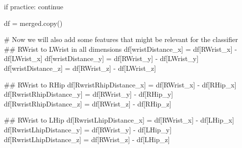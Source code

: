 \documentclass[
  letterpaper,
  DIV=11,
  numbers=noendperiod]{scrreprt}
\newenvironment{Shaded}{\begin{snugshade}}{\end{snugshade}}
\newcommand{\CommentTok}[1]{\textcolor[rgb]{0.37,0.37,0.37}{#1}}
\newcommand{\ControlFlowTok}[1]{\textcolor[rgb]{0.00,0.23,0.31}{#1}}
\newcommand{\NormalTok}[1]{\textcolor[rgb]{0.00,0.23,0.31}{#1}}
\newcommand{\OperatorTok}[1]{\textcolor[rgb]{0.37,0.37,0.37}{#1}}
\newcommand{\StringTok}[1]{\textcolor[rgb]{0.13,0.47,0.30}{#1}}
\begin{document}
\begin{Shaded}
\begin{Highlighting}[]
    \ControlFlowTok{if}\NormalTok{ practice:}
        \ControlFlowTok{continue}

\NormalTok{    df }\OperatorTok{=}\NormalTok{ merged.copy()}

    \CommentTok{\# Now we will also add some features that might be relevant for the classifier}
    \CommentTok{\#\# RWrist to LWrist in all dimensions}
\NormalTok{    df[}\StringTok{\textquotesingle{}wristDistance\_x\textquotesingle{}}\NormalTok{] }\OperatorTok{=}\NormalTok{ df[}\StringTok{\textquotesingle{}RWrist\_x\textquotesingle{}}\NormalTok{] }\OperatorTok{{-}}\NormalTok{ df[}\StringTok{\textquotesingle{}LWrist\_x\textquotesingle{}}\NormalTok{]}
\NormalTok{    df[}\StringTok{\textquotesingle{}wristDistance\_y\textquotesingle{}}\NormalTok{] }\OperatorTok{=}\NormalTok{ df[}\StringTok{\textquotesingle{}RWrist\_y\textquotesingle{}}\NormalTok{] }\OperatorTok{{-}}\NormalTok{ df[}\StringTok{\textquotesingle{}LWrist\_y\textquotesingle{}}\NormalTok{]}
\NormalTok{    df[}\StringTok{\textquotesingle{}wristDistance\_z\textquotesingle{}}\NormalTok{] }\OperatorTok{=}\NormalTok{ df[}\StringTok{\textquotesingle{}RWrist\_z\textquotesingle{}}\NormalTok{] }\OperatorTok{{-}}\NormalTok{ df[}\StringTok{\textquotesingle{}LWrist\_z\textquotesingle{}}\NormalTok{]}

    \CommentTok{\#\# RWrist to RHip}
\NormalTok{    df[}\StringTok{\textquotesingle{}RwristRhipDistance\_x\textquotesingle{}}\NormalTok{] }\OperatorTok{=}\NormalTok{ df[}\StringTok{\textquotesingle{}RWrist\_x\textquotesingle{}}\NormalTok{] }\OperatorTok{{-}}\NormalTok{ df[}\StringTok{\textquotesingle{}RHip\_x\textquotesingle{}}\NormalTok{]}
\NormalTok{    df[}\StringTok{\textquotesingle{}RwristRhipDistance\_y\textquotesingle{}}\NormalTok{] }\OperatorTok{=}\NormalTok{ df[}\StringTok{\textquotesingle{}RWrist\_y\textquotesingle{}}\NormalTok{] }\OperatorTok{{-}}\NormalTok{ df[}\StringTok{\textquotesingle{}RHip\_y\textquotesingle{}}\NormalTok{]}
\NormalTok{    df[}\StringTok{\textquotesingle{}RwristRhipDistance\_z\textquotesingle{}}\NormalTok{] }\OperatorTok{=}\NormalTok{ df[}\StringTok{\textquotesingle{}RWrist\_z\textquotesingle{}}\NormalTok{] }\OperatorTok{{-}}\NormalTok{ df[}\StringTok{\textquotesingle{}RHip\_z\textquotesingle{}}\NormalTok{]}

    \CommentTok{\#\# RWrist to LHip}
\NormalTok{    df[}\StringTok{\textquotesingle{}RwristLhipDistance\_x\textquotesingle{}}\NormalTok{] }\OperatorTok{=}\NormalTok{ df[}\StringTok{\textquotesingle{}RWrist\_x\textquotesingle{}}\NormalTok{] }\OperatorTok{{-}}\NormalTok{ df[}\StringTok{\textquotesingle{}LHip\_x\textquotesingle{}}\NormalTok{]}
\NormalTok{    df[}\StringTok{\textquotesingle{}RwristLhipDistance\_y\textquotesingle{}}\NormalTok{] }\OperatorTok{=}\NormalTok{ df[}\StringTok{\textquotesingle{}RWrist\_y\textquotesingle{}}\NormalTok{] }\OperatorTok{{-}}\NormalTok{ df[}\StringTok{\textquotesingle{}LHip\_y\textquotesingle{}}\NormalTok{]}
\NormalTok{    df[}\StringTok{\textquotesingle{}RwristLhipDistance\_z\textquotesingle{}}\NormalTok{] }\OperatorTok{=}\NormalTok{ df[}\StringTok{\textquotesingle{}RWrist\_z\textquotesingle{}}\NormalTok{] }\OperatorTok{{-}}\NormalTok{ df[}\StringTok{\textquotesingle{}LHip\_z\textquotesingle{}}\NormalTok{]}


\end{Highlighting}
\end{Shaded}
\end{document}
